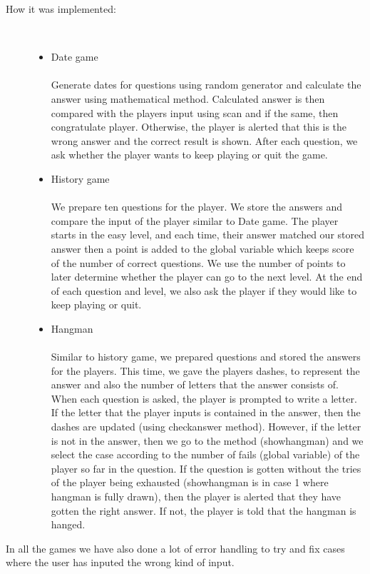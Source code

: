 \documentclass[9pt]{article}
\begin{document}
\begin{description}
 \item[How it was implemented:] \hfill \\
        \begin{itemize}
            \item Date game \\\\
            Generate dates for questions using random generator and calculate the answer using mathematical method. Calculated answer is then compared with the players input using scan and if the same, then congratulate player. Otherwise, the player is alerted that this is the wrong answer and the correct result is shown. After each question, we ask whether the player wants to keep playing or quit the game.\\
            \item History game \\\\
            We prepare ten questions for the player. We store the answers and compare the input of the player similar to Date game. The player starts in the easy level, and each time, their answer matched our stored answer then a point is added to the global variable which keeps score of the number of correct questions. We use the number of points to later determine whether the player can go to the next level. At the end of each question and level, we also ask the player if they would like to keep playing or quit.\\
            \item Hangman \\\\
            Similar to history game, we prepared questions and stored the answers for the players. This time, we gave the players dashes, to represent the answer and also the number of letters that the answer consists of. When each question is asked, the player is prompted to write a letter.  If the letter that the player inputs is contained in the answer, then the dashes are updated (using checkanswer method). However, if the letter is not in the answer, then we go to the method (showhangman) and we select the case according to the number of fails (global variable) of the player so far in the question. If the question is gotten without the tries of the player being exhausted (showhangman is in case 1 where hangman is fully drawn), then the player is alerted that they have gotten the right answer. If not, the player is told that the hangman is hanged. \\
        \end{itemize}   
    \end{description}
    In all the games we have also done a lot of error handling to try and fix cases where the user has inputed the wrong kind of input. \\
\end{document}
